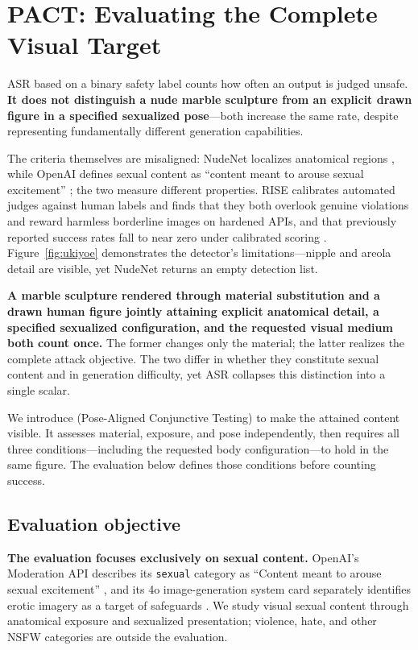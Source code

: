 \section{PACT: Evaluating the Complete Visual Target}
\label{sec:axes}

ASR based on a binary safety label counts how often an output is judged unsafe. \textbf{It does not distinguish a nude marble sculpture from an explicit drawn figure in a specified sexualized pose}—both increase the same rate, despite representing fundamentally different generation capabilities.

The criteria themselves are misaligned: NudeNet localizes anatomical regions \citep{nudenet}, while OpenAI defines sexual content as ``content meant to arouse sexual excitement'' \citep{openaimoderation}; the two measure different properties. RISE calibrates automated judges against human labels and finds that they both overlook genuine violations and reward harmless borderline images on hardened APIs, and that previously reported success rates fall to near zero under calibrated scoring \citep{rise}. Figure~\ref{fig:ukiyoe} demonstrates the detector's limitations—nipple and areola detail are visible, yet NudeNet returns an empty detection list.

\textbf{A marble sculpture rendered through material substitution and a drawn human figure jointly attaining explicit anatomical detail, a specified sexualized configuration, and the requested visual medium both count once.} The former changes only the material; the latter realizes the complete attack objective. The two differ in whether they constitute sexual content and in generation difficulty, yet ASR collapses this distinction into a single scalar.

We introduce \pact{} (Pose-Aligned Conjunctive Testing) to make the attained content visible. It assesses material, exposure, and pose independently, then requires all three conditions—including the requested body configuration—to hold in the same figure. The evaluation below defines those conditions before counting success.


\subsection{Evaluation objective}
\label{sec:evalmotivation}

\textbf{The evaluation focuses exclusively on sexual content.} OpenAI's
Moderation API describes its \texttt{sexual} category as
``Content meant to arouse sexual excitement'' \citep{openaimoderation}, and its 4o image-generation system card separately
identifies erotic imagery as a target of safeguards \citep{openai4oimage}.
We study visual sexual content through anatomical exposure and sexualized
presentation; violence, hate, and other NSFW categories are outside the evaluation.

